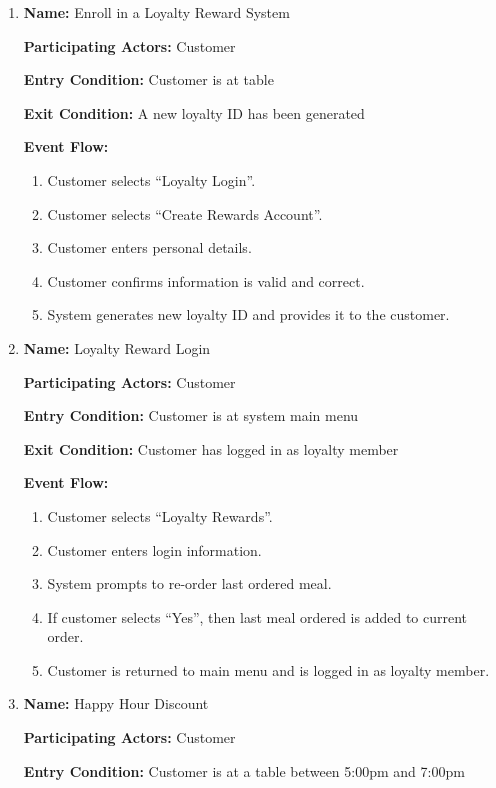 \documentclass[11pt]{article}
\begin{document}
\begin{enumerate}
		\newpage

		\item \textbf{Name:} 				Enroll in a Loyalty Reward System

			\textbf{Participating Actors:} 	Customer

			\textbf{Entry Condition:} 		Customer is at table

			\textbf{Exit Condition:} 		A new loyalty ID has been generated

			\textbf{Event Flow:}
			\begin{enumerate}
				\setlength{\leftskip}{1cm}
				\item Customer selects ``Loyalty Login''.
				\item Customer selects ``Create Rewards Account''.
				\item Customer enters personal details.
				\item Customer confirms information is valid and correct.
				\item System generates new loyalty ID and provides it to the customer.\\
			\end{enumerate}

		\item \textbf{Name:} 				Loyalty Reward Login

			\textbf{Participating Actors:} 	Customer

			\textbf{Entry Condition:} 		Customer is at system main menu

			\textbf{Exit Condition:} 		Customer has logged in as loyalty member

			\textbf{Event Flow:}
			\begin{enumerate}
				\setlength{\leftskip}{1cm}
				\item Customer selects ``Loyalty Rewards''.
				\item Customer enters login information.
				\item System prompts to re-order last ordered meal.
				\item If customer selects ``Yes'', then last meal ordered is added to current order.
				\item Customer is returned to main menu and is logged in as loyalty member.
			\end{enumerate}

		\item \textbf{Name:} 				Happy Hour Discount

			\textbf{Participating Actors:} 	Customer

			\textbf{Entry Condition:} 		Customer is at a table between 5:00pm and 7:00pm


\end{enumerate}
\end{document}
